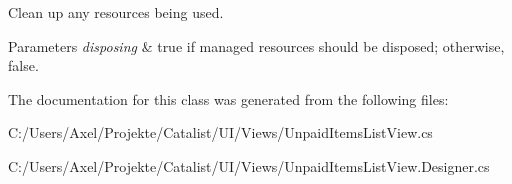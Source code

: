 Clean up any resources being used. 


\begin{DoxyParams}{Parameters}
{\em disposing} & true if managed resources should be disposed; otherwise, false.\\
\hline
\end{DoxyParams}


The documentation for this class was generated from the following files\+:\begin{DoxyCompactItemize}
\item 
C\+:/\+Users/\+Axel/\+Projekte/\+Catalist/\+U\+I/\+Views/Unpaid\+Items\+List\+View.\+cs\item 
C\+:/\+Users/\+Axel/\+Projekte/\+Catalist/\+U\+I/\+Views/Unpaid\+Items\+List\+View.\+Designer.\+cs\end{DoxyCompactItemize}
